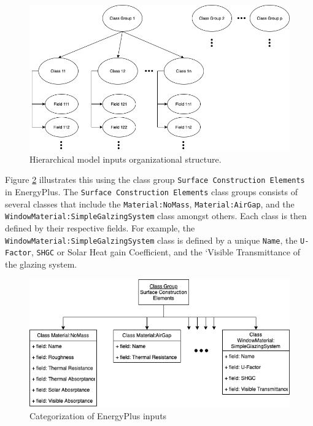 \documentclass[
]{book}
\begin{document}
\begin{figure}

{\centering \includegraphics[width=0.8\linewidth]{figures/group_class_field} 

}

\caption{Hierarchical model inputs organizational structure.}\label{fig:group-class-field}
\end{figure}

Figure \ref{fig:input-structure} illustrates this using the class group \texttt{Surface\ Construction\ Elements} in EnergyPlus. The \texttt{Surface\ Construction\ Elements} class groups consists of several classes that include the \texttt{Material:NoMass}, \texttt{Material:AirGap}, and the \texttt{WindowMaterial:SimpleGalzingSystem} class amongst others. Each class is then defined by their respective fields. For example, the \texttt{WindowMaterial:SimpleGalzingSystem} class is defined by a unique \texttt{Name}, the \texttt{U-Factor}, \texttt{SHGC} or Solar Heat gain Coefficient, and the `Visible Transmittance of the glazing system.

\begin{figure}

{\centering \includegraphics[width=0.8\linewidth]{figures/input_structure} 

}

\caption{Categorization of EnergyPlus inputs}\label{fig:input-structure}
\end{figure}
\end{document}

